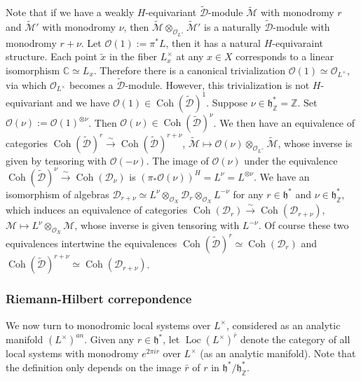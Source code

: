 \documentclass[12pt]{amsart}
\newcommand{\C}{\mathbb{C}}
\newcommand{\M}{\mathcal{M}}
\newcommand{\Z}{\mathbb{Z}}
\newcommand{\hf}{\mathfrak{h}}
\newcommand{\OO}{\mathcal{O}}
\newcommand{\wt}{\widetilde}
\newcommand{\loc}{\operatorname{Loc}}
\newcommand{\coh}{\operatorname{Coh}}
\theoremstyle{definition}
\numberwithin{equation}{section}
\begin{document}
Note that if we have a weakly $H$-equivariant $\wt{\mathscr{D}}$-module $\wt{\M}$ with monodromy $r$ and $\wt{\M}'$ with monodromy $\nu$, then $\wt{\M} \otimes_{\OO_{L^\times}} \wt{\M}'$ is a naturally $\wt{\mathscr{D}}$-module with monodromy $r + \nu$. Let $\OO(1) := \pi^* L$, then it has a natural $H$-equivaraint structure. Each point $\tilde{x}$ in the fiber $L^\times_x $ at any $x \in X$ corresponds to a linear  isomorphism $\C \simeq L_x$. Therefore there is a canonical trivialization $\OO(1) \simeq \OO_{L^\times}$, via which $\OO_{L^\times}$ becomes a $\wt{\mathscr{D}}$-module. However, this trivialization is not $H$-equivariant and we have $\OO(1) \in \coh(\wt{\mathscr{D}})^{1}$. Suppose $\nu \in \hf^*_\Z=\Z$. Set $\OO(\nu):=\OO(1)^{\otimes \nu}$. Then $\OO(\nu) \in \coh(\wt{\mathscr{D}})^{\nu}$. We then have an equivalence of categories $\coh(\wt{\mathscr{D}})^{r}  \xrightarrow{\sim} \coh(\wt{\mathscr{D}})^{r + \nu}$, $\wt{\M} \mapsto \OO(\nu) \otimes_{\OO_{L^\times}} \wt{\M}$, whose inverse is given by tensoring with $\OO(-\nu)$. The image of $\OO(\nu)$ under the equivalence $\coh(\wt{\mathscr{D}})^{\nu} \xrightarrow{\sim} \coh(\mathscr{D}_\nu)$ is $(\pi_*\OO(\nu))^H = L^{\nu} = L^{\otimes \nu}$. We have an isomorphism of algebras $\mathscr{D}_{r+\nu} \simeq  L^{\nu} \otimes_{\OO_X} \mathscr{D}_{r} \otimes_{\OO_X} L^{-\nu}$ for any $r \in \hf^*$ and $\nu \in \hf^*_\Z$, which induces an equivalence of categories $\coh(\mathscr{D}_r) \xrightarrow{\sim} \coh(\mathscr{D}_{r + \nu})$, $\M \mapsto L^{\nu} \otimes_{\OO_X} \M$, whose inverse is given tensoring with $L^{-\nu}$. Of course these two equivalences intertwine the equivalences $\coh(\wt{\mathscr{D}})^{r} \simeq \coh(\mathscr{D}_r)$ and $\coh(\wt{\mathscr{D}})^{r+\nu} \simeq \coh(\mathscr{D}_{r+\nu})$.


\subsubsection{Riemann-Hilbert correpondence} \label{subsec:RH}
We now turn to monodromic local systems over $L^\times$, considered as an analytic manifold $(L^\times)^{an}$.  Given any $r \in \hf^*$, let $\loc(L^\times)^{\bar{r}}$ denote the category of all local systems with monodromy $e^{2 \pi i r}$ over $L^\times$ (as an analytic manifold). Note that the definition only depends on the image $\bar{r}$ of $r$ in $\hf^*/\hf_\Z^*$.
\end{document}
